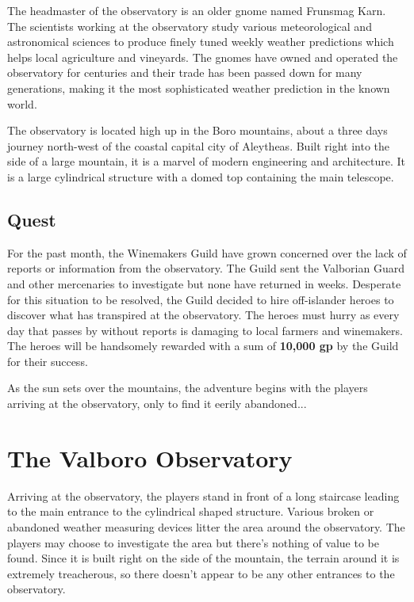\documentclass{article}
\begin{document}
\begin{multicols*}{2}
		The headmaster of the observatory is an older gnome named Frunsmag Karn. The scientists working at the observatory study various meteorological and astronomical sciences to produce finely tuned weekly weather predictions which helps local agriculture and vineyards. The gnomes have owned and operated the observatory for centuries and their trade has been passed down for many generations, making it the most sophisticated weather prediction in the known world.
		
		The observatory is located high up in the Boro mountains, about a three days journey north-west of the coastal capital city of Aleytheas. Built right into the side of a large mountain, it is a marvel of modern engineering and architecture. It is a large cylindrical structure with a domed top containing the main telescope.
		
		\subsection*{Quest}
		For the past month, the Winemakers Guild have grown concerned over the lack of reports or information from the observatory. The Guild sent the Valborian Guard and other mercenaries to investigate but none have returned in weeks. Desperate for this situation to be resolved, the Guild decided to hire off-islander heroes to discover what has transpired at the observatory. The heroes must hurry as every day that passes by without reports is damaging to local farmers and winemakers. The heroes will be handsomely rewarded with a sum of \textbf{10,000 gp} by the Guild for their success.
		
		As the sun sets over the mountains, the adventure begins with the players arriving at the observatory, only to find it eerily abandoned...
		
	\section{The Valboro Observatory}
		Arriving at the observatory, the players stand in front of a long staircase leading to the main entrance to the cylindrical shaped structure. Various broken or abandoned weather measuring devices litter the area around the observatory. The players may choose to investigate the area but there's nothing of value to be found. Since it is built right on the side of the mountain, the terrain around it is extremely treacherous, so there doesn't appear to be any other entrances to the observatory.
		

\end{multicols*}
\end{document}
